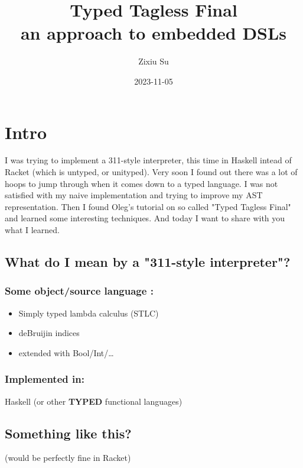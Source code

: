 \documentclass[11pt]{article}
\author{Zixiu Su}
\date{2023-11-05}
\title{Typed Tagless Final\\\medskip
\large an approach to embedded DSLs}
\begin{document}
\maketitle
\setcounter{tocdepth}{1}
\tableofcontents



\section*{Intro}
\label{sec:org0b54e77}
\begin{NOTES}
I was trying to implement a 311-style interpreter, this time in Haskell intead of Racket (which is untyped, or unityped). Very soon I found out there was a lot of hoops to jump through when it comes down to a typed language. I was not satisfied with my naive implementation and trying to improve my AST representation. Then I found Oleg's tutorial on so called "Typed Tagless Final" and learned some interesting techniques. And today I want to share with you what I learned.
\end{NOTES}

\subsection*{What do I mean by a "311-style interpreter"?}
\label{sec:orgad59c7d}

\subsubsection*{Some object/source language :}
\label{sec:org92f5ef9}
\begin{itemize}
\item Simply typed lambda calculus (STLC)
\item deBruijin indices
\item extended with Bool/Int/\ldots{}
\end{itemize}
\subsubsection*{Implemented in:}
\label{sec:org38d6920}
Haskell (or other \textbf{TYPED} functional languages)

\subsection*{Something like this?}
\label{sec:org0f206ef}

\begin{NOTES}
(would be perfectly fine in Racket)
\end{NOTES}
\end{document}

